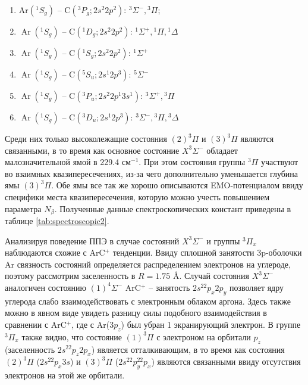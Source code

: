 \documentclass[12pt]{extarticle}
\begin{document}
	\begin{enumerate}
		\item $\text{Ar}\left({ }^1 S_g\right)\text{ -- }\text{C}\left({ }^3 P_g ; 2 s^2 2 p^2\right)$: ${ }^3 \Sigma^{-},{ }^3 \Pi$; 
		\item $\operatorname{Ar}\left({ }^1 S_g\right) \text{ -- }\text{C}\left({ }^1 D_g ; 2 s^2 2 p^2\right)$: ${ }^1 \Sigma^{+}, { }^1 \Pi,{ }^1 \Delta$
		\item $\operatorname{Ar}\left({ }^1 S_g\right) \text{ -- } \text{C}\left({ }^1 S_g ; 2 s^2 2 p^2\right)$: ${ }^1 \Sigma^{+}$
		\item $\operatorname{Ar}\left({ }^1 S_g\right) \text{ -- } \text{C}\left({ }^5 S_u ; 2 s^1 2 p^3\right)$: ${ }^5 \Sigma^{-}$
		\item $\operatorname{Ar}\left({ }^1 S_g\right) \text{ -- } \text{C}\left({ }^3 P_u ; 2 s^2 2 p^1 3 s^1\right)$: ${ }^3 \Sigma^{+},{ }^3 \Pi$
		\item $\operatorname{Ar}\left({ }^1 S_g\right) \text{ -- } \text{C}\left({ }^3 D_u ; 2 s^1 2 p^3\right)$: ${ }^3 \Sigma^{-},{ }^3 \Pi,{ }^3 \Delta$
	\end{enumerate}
	
	Среди них только высоколежащие состояния $(2)^3\Pi$ и $(3)^3\Pi$ являются связанными, в то время как основное состояние $X^3\Sigma^-$ обладает малозначительной ямой в 229.4 см$^{-1}$. При этом состояния группы $^3\Pi$ участвуют во взаимных квазипересечениях, из-за чего дополнительно уменьшается глубина ямы $(3)^3\Pi$. Обе ямы все так же хорошо описываются EMO-потенциалом ввиду специфики места квазипересечения, которую можно учесть повышением параметра $N_\beta$. Полученные данные спектроскопических констант приведены в таблице \ref{tab:spectroscopic2}.
	
	Анализируя поведение ППЭ в случае состояний $X^3\Sigma^-$ и группы $^3\Pi_x$ наблюдаются схожие с ArC$^+$ тенденции. Ввиду сплошной занятости 3p-оболочки Ar связность состояний определяется распределением электронов на углероде, поэтому рассмотрим заселенность в $R=1.75$ \AA. Случай состояния $X^3\Sigma^-$ аналогичен состоянию $(1)^4 \Sigma^-$ ArC$^+$ -- занятость $2s^22p_x2p_y$ позволяет ядру углерода слабо взаимодействовать с электронным облаком аргона. Здесь также можно в явном виде увидеть разницу силы подобного взаимодействия в сравнении с ArC$^+$, где с Ar($3p_z$) был убран 1 экранирующий электрон. В группе $^3\Pi_x$ также видно, что состояние $(1)^3\Pi$ с электроном на орбитали $p_z$ (заселенность $2s^22p_z2p_x$) является отталкивающим, в то время как состояния $(2)^3\Pi$ ($2s^22p_x3s$) и $(3)^3\Pi$ ($2s^22p_y^22p_x$) являются связанными ввиду отсутствия электронов на этой же орбитали.
	
\end{document}
